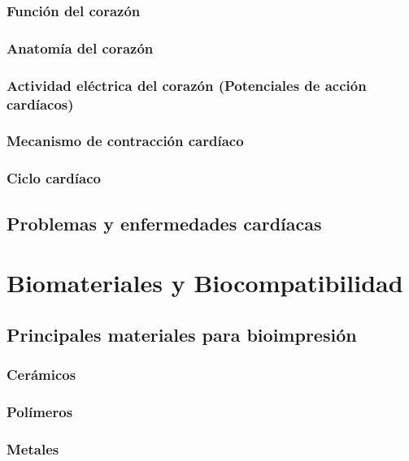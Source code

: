 \documentclass[a4paper,12pt]{article}
\begin{document}
\subsubsection{Función del corazón}

\subsubsection{Anatomía del corazón}

\subsubsection{Actividad eléctrica del corazón (Potenciales de acción cardíacos)}

\subsubsection{Mecanismo de contracción cardíaco}

\subsubsection{Ciclo cardíaco}

\subsection{Problemas y enfermedades cardíacas}

\pagebreak
\section{Biomateriales y Biocompatibilidad}

\subsection{Principales materiales para bioimpresión}

\subsubsection{Cerámicos}

\subsubsection{Polímeros}

\subsubsection{Metales}
\end{document}
